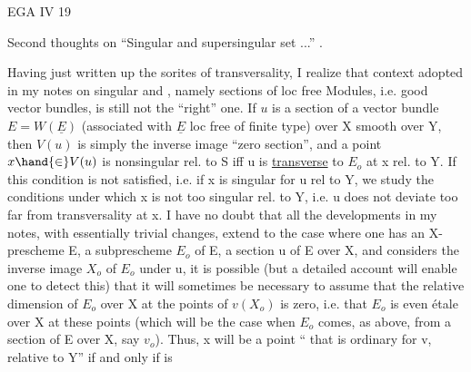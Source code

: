 
EGA IV 19

Second thoughts on ``Singular and supersingular set ...'' .

Having just written up the sorites of transversality, I realize that 
context adopted in my notes on singular and  ,
namely sections of loc free Modules, i.e. good vector bundles,
is still not the ``right'' one. If $u$ is a section of a vector bundle
$E = W(\underline{E})$ (associated with $\underline{E}$ loc free of finite type) over X smooth over Y, then $V(u)$
is simply the inverse image   ``zero section'', and a point $x\hand{\in} V(u)$
is nonsingular  rel. to S iff u is \uline{transverse} to $E_{o}$ at x rel. to Y.
If this condition is not satisfied, i.e. if x is singular for u rel to
Y, we study the conditions under which x is not too singular
rel. to Y, i.e. u does not deviate too far from transversality at x. I have
no doubt that all the developments in my notes, with essentially
trivial changes, extend to the case where one has an X-prescheme E, a
subprescheme $E_{o}$ of E, a section u of E over X, and considers the inverse
image $X_{o}$ of $E_{o}$ under u,  it is possible (but  a detailed
account will enable one to detect this) that it will sometimes be necessary to assume that
the relative dimension of $E_{o}$ over X at the points of $v(X_{o})$ is zero, i.e. that $E_{o}$ is
even étale over X at these points (which will be the case when $E_{o}$ comes, as
above, from a section of E over X, say $v_{o}$). Thus, x will be a point
``  that is ordinary for v, relative to Y'' if and only if    is
